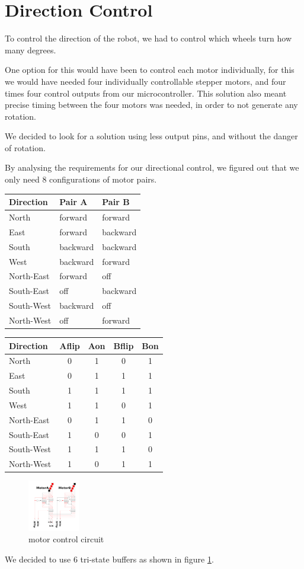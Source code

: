 \section{Direction Control}\label{sec:direction}
To control the direction of the robot,
we had to control which wheels turn how many degrees.

One option for this would have been to control each motor individually,
for this we would have needed four individually controllable stepper motors,
and four times four control outputs from our microcontroller.
This solution also meant precise timing between the four motors was needed,
in order to not generate any rotation.

We decided to look for a solution using less output pins,
and without the danger of rotation.

By analysing the requirements for our directional control,
we figured out that we only need 8 configurations of motor pairs.
\begin{center}
\begin{tabular}{|l|l|l|}
	\hline
	Direction & Pair A & Pair B	\\
	\hline
	North & forward & forward \\
	East 	& forward & backward \\
	South & backward & backward \\
	West 	& backward & forward \\
	\hline
	North-East & forward & off \\
	South-East & off & backward \\
	South-West & backward & off\\
	North-West & off & forward \\
	\hline
\end{tabular}
\begin{tabular}{|l|c|c|c|c|}
	\hline
	Direction & Aflip & Aon & Bflip & Bon \\
	\hline
	North & 0 & 1 & 0 & 1 \\
	East 	& 0 & 1 & 1 & 1 \\
	South & 1 & 1 & 1 & 1 \\
	West 	& 1 & 1 & 0 & 1 \\
	\hline
	North-East & 0 & 1 & 1 & 0 \\
	South-East & 1 & 0 & 0 & 1 \\
	South-West & 1 & 1 & 1 & 0 \\
	North-West & 1 & 0 & 1 & 1 \\
	\hline
\end{tabular}
\end{center}
\begin{figure}[htp]
	\centering
	\includegraphics[width=0.2\textwidth]{figures/move/direction_choice}
	\caption{motor control circuit}
	\label{fig:mot_ctrl}
\end{figure}

We decided to use 6 tri-state buffers as shown in figure \ref{fig:mot_ctrl}.
